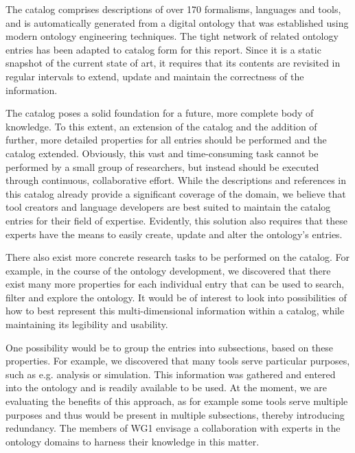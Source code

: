 \documentclass[final]{include/MPM4CPS/MPM4CPS-Report} %
\newcommand{\COMMENT}[2][N.N.]{\todo[color=yellow]{\tiny COMMENT[#1]: #2}}
\begin{document}
The catalog comprises descriptions of over 170 formalisms, languages and tools, and is automatically generated from a digital ontology that was established using modern ontology engineering techniques.
The tight network of related ontology entries has been adapted to catalog form for this report.
Since it is a static snapshot of the current state of art, it requires that its contents are revisited in regular intervals to extend, update and maintain the correctness of the information.



The catalog poses a solid foundation for a future, more complete body of knowledge.
To this extent, an extension of the catalog and the addition of further, more detailed properties for all entries should be performed and the catalog extended.
Obviously, this vast and time-consuming task cannot be performed by a small group of researchers, but instead should be executed through continuous, collaborative effort.
While the descriptions and references in this catalog already provide a significant coverage of the domain, we believe that tool creators and language developers are best suited to maintain the catalog entries for their field of expertise. Evidently, this solution also requires that these experts have the means to easily create, update and alter the ontology's entries.

There also exist more concrete research tasks to be performed on the catalog.
For example, in the course of the ontology development, we discovered that there exist many more properties for each individual entry that can be used to search, filter and explore the ontology.
It would be of interest to look into possibilities of how to best represent this multi-dimensional information within a catalog, while maintaining its legibility and usability.

One possibility would be to group the entries into subsections, based on these properties.
For example, we discovered that many tools serve particular purposes, such as e.g. analysis or simulation.
This information was gathered and entered into the ontology and is readily available to be used.
At the moment, we are evaluating the benefits of this approach, as for example some tools serve multiple purposes and thus would be present in multiple subsections, thereby introducing redundancy.
The members of WG1 envisage a collaboration with experts in the ontology domains to harness their knowledge in this matter.
\end{document}
